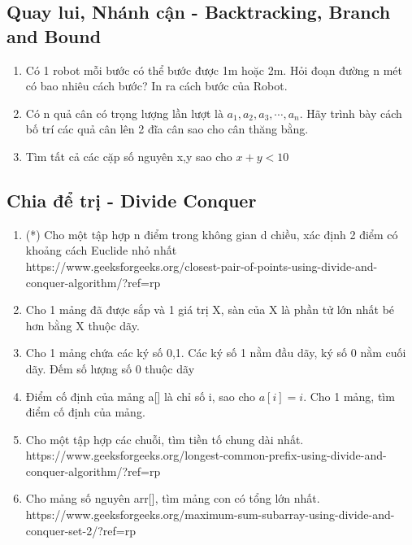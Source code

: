 \documentclass[12pt,a4paper]{article}
\begin{document}
\subsection{Quay lui, Nhánh cận - Backtracking, Branch and Bound}
\begin{enumerate}
	\item Có 1 robot mỗi bước có thể bước được 1m hoặc 2m. Hỏi đoạn đường n mét có bao nhiêu cách bước? In ra cách bước của Robot.
	\item Có n quả cân có trọng lượng lần lượt là $a_1, a_2, a_3,\cdots, a_n$. Hãy trình bày cách bố trí các quả cân lên 2 đĩa cân sao cho cân thăng bằng.
	\item Tìm tất cả các cặp số nguyên x,y sao cho $x + y < 10$
\end{enumerate}
\subsection{Chia để trị - Divide Conquer}
\begin{enumerate}
	\item (*) Cho một tập hợp n điểm trong không gian d chiều, xác định 2 điểm có khoảng cách Euclide nhỏ nhất \\
	https://www.geeksforgeeks.org/closest-pair-of-points-using-divide-and-conquer-algorithm/?ref=rp
	\item Cho 1 mảng đã được sắp và 1 giá trị X, sàn của X là phần tử lớn nhất bé hơn bằng X thuộc dãy.
	\item Cho 1 mảng chứa các ký số 0,1. Các ký số 1 nằm đầu dãy, ký số 0 nằm cuối dãy. Đếm số lượng số 0 thuộc dãy
	\item Điểm cố định của mảng a[] là chỉ số i, sao cho $a[i]=i$. Cho 1 mảng, tìm điểm cố định của mảng.
	\item Cho một tập hợp các chuỗi, tìm tiền tố chung dài nhất. \\
	https://www.geeksforgeeks.org/longest-common-prefix-using-divide-and-conquer-algorithm/?ref=rp
	\item Cho mảng số nguyên arr[], tìm mảng con có tổng lớn nhất. \\
	https://www.geeksforgeeks.org/maximum-sum-subarray-using-divide-and-conquer-set-2/?ref=rp
\end{enumerate}
\end{document}
